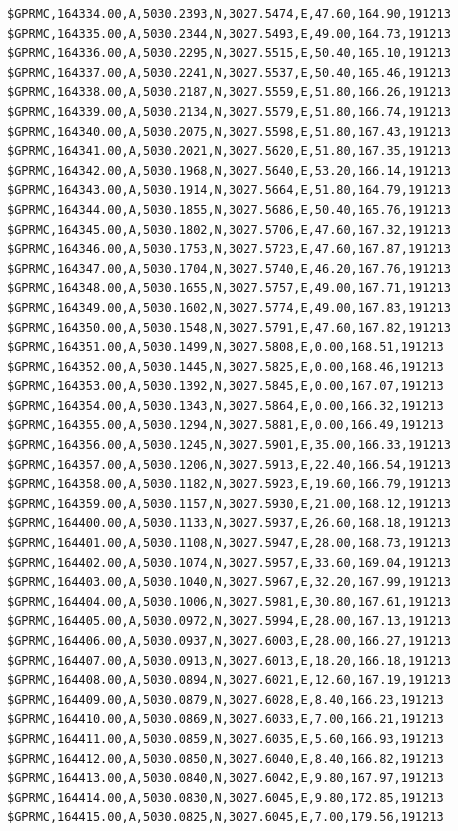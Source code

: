 \documentclass[simple,a4paper,14pt,ukrainian,utf8]{eskdtext}
\begin{document}
\begin{appendices}
\begin{small}
\begin{lstlisting}
$GPRMC,164334.00,A,5030.2393,N,3027.5474,E,47.60,164.90,191213
$GPRMC,164335.00,A,5030.2344,N,3027.5493,E,49.00,164.73,191213
$GPRMC,164336.00,A,5030.2295,N,3027.5515,E,50.40,165.10,191213
$GPRMC,164337.00,A,5030.2241,N,3027.5537,E,50.40,165.46,191213
$GPRMC,164338.00,A,5030.2187,N,3027.5559,E,51.80,166.26,191213
$GPRMC,164339.00,A,5030.2134,N,3027.5579,E,51.80,166.74,191213
$GPRMC,164340.00,A,5030.2075,N,3027.5598,E,51.80,167.43,191213
$GPRMC,164341.00,A,5030.2021,N,3027.5620,E,51.80,167.35,191213
$GPRMC,164342.00,A,5030.1968,N,3027.5640,E,53.20,166.14,191213
$GPRMC,164343.00,A,5030.1914,N,3027.5664,E,51.80,164.79,191213
$GPRMC,164344.00,A,5030.1855,N,3027.5686,E,50.40,165.76,191213
$GPRMC,164345.00,A,5030.1802,N,3027.5706,E,47.60,167.32,191213
$GPRMC,164346.00,A,5030.1753,N,3027.5723,E,47.60,167.87,191213
$GPRMC,164347.00,A,5030.1704,N,3027.5740,E,46.20,167.76,191213
$GPRMC,164348.00,A,5030.1655,N,3027.5757,E,49.00,167.71,191213
$GPRMC,164349.00,A,5030.1602,N,3027.5774,E,49.00,167.83,191213
$GPRMC,164350.00,A,5030.1548,N,3027.5791,E,47.60,167.82,191213
$GPRMC,164351.00,A,5030.1499,N,3027.5808,E,0.00,168.51,191213
$GPRMC,164352.00,A,5030.1445,N,3027.5825,E,0.00,168.46,191213
$GPRMC,164353.00,A,5030.1392,N,3027.5845,E,0.00,167.07,191213
$GPRMC,164354.00,A,5030.1343,N,3027.5864,E,0.00,166.32,191213
$GPRMC,164355.00,A,5030.1294,N,3027.5881,E,0.00,166.49,191213
$GPRMC,164356.00,A,5030.1245,N,3027.5901,E,35.00,166.33,191213
$GPRMC,164357.00,A,5030.1206,N,3027.5913,E,22.40,166.54,191213
$GPRMC,164358.00,A,5030.1182,N,3027.5923,E,19.60,166.79,191213
$GPRMC,164359.00,A,5030.1157,N,3027.5930,E,21.00,168.12,191213
$GPRMC,164400.00,A,5030.1133,N,3027.5937,E,26.60,168.18,191213
$GPRMC,164401.00,A,5030.1108,N,3027.5947,E,28.00,168.73,191213
$GPRMC,164402.00,A,5030.1074,N,3027.5957,E,33.60,169.04,191213
$GPRMC,164403.00,A,5030.1040,N,3027.5967,E,32.20,167.99,191213
$GPRMC,164404.00,A,5030.1006,N,3027.5981,E,30.80,167.61,191213
$GPRMC,164405.00,A,5030.0972,N,3027.5994,E,28.00,167.13,191213
$GPRMC,164406.00,A,5030.0937,N,3027.6003,E,28.00,166.27,191213
$GPRMC,164407.00,A,5030.0913,N,3027.6013,E,18.20,166.18,191213
$GPRMC,164408.00,A,5030.0894,N,3027.6021,E,12.60,167.19,191213
$GPRMC,164409.00,A,5030.0879,N,3027.6028,E,8.40,166.23,191213
$GPRMC,164410.00,A,5030.0869,N,3027.6033,E,7.00,166.21,191213
$GPRMC,164411.00,A,5030.0859,N,3027.6035,E,5.60,166.93,191213
$GPRMC,164412.00,A,5030.0850,N,3027.6040,E,8.40,166.82,191213
$GPRMC,164413.00,A,5030.0840,N,3027.6042,E,9.80,167.97,191213
$GPRMC,164414.00,A,5030.0830,N,3027.6045,E,9.80,172.85,191213
$GPRMC,164415.00,A,5030.0825,N,3027.6045,E,7.00,179.56,191213

\end{lstlisting}
\end{small}
\end{appendices}
\end{document}
